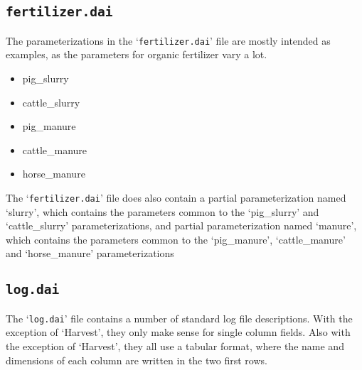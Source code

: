 \subsection{\texttt{fertilizer.dai}}

The parameterizations in the `\texttt{fertilizer.dai}' file are mostly
intended as examples, as the parameters for organic fertilizer vary
a lot.  
\begin{itemize}
\item pig\_slurry
\item cattle\_slurry
\item pig\_manure
\item cattle\_manure
\item horse\_manure
\end{itemize}
The `\texttt{fertilizer.dai}' file does also contain a partial
parameterization named `slurry', which contains the parameters common
to the `pig\_slurry' and `cattle\_slurry' parameterizations, and
partial parameterization named `manure', which contains the parameters
common to the `pig\_manure', `cattle\_manure' and `horse\_manure'
parameterizations

\subsection{\texttt{log.dai}}

The `\texttt{log.dai}' file contains a number of standard log file
descriptions.  With the exception of `Harvest', they only make sense
for single column fields.  Also with the exception of `Harvest', they
all use a tabular format, where the name and dimensions of each column
are written in the two first rows.

